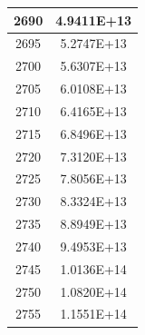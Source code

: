 \documentclass[a4paper]{article}
\begin{document}
\begin{tabular}{|c|c|}
		\hline
		2690 & 4.9411E+13 \\
		\hline
		2695 & 5.2747E+13 \\
		\hline
		2700 & 5.6307E+13 \\
		\hline
		2705 & 6.0108E+13 \\
		\hline
		2710 & 6.4165E+13 \\
		\hline
		2715 & 6.8496E+13 \\
		\hline
		2720 & 7.3120E+13 \\
		\hline
		2725 & 7.8056E+13 \\
		\hline
		2730 & 8.3324E+13 \\
		\hline
		2735 & 8.8949E+13 \\
		\hline
		2740 & 9.4953E+13 \\
		\hline
		2745 & 1.0136E+14 \\
		\hline
		2750 & 1.0820E+14 \\
		\hline
		2755 & 1.1551E+14 \\
		\hline
	\end{tabular}
	\hfill
\end{document}
